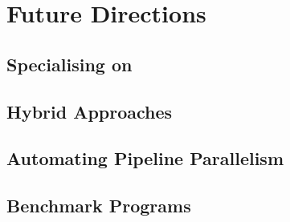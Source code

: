 \documentclass[openright, dottedtoc, headinclude, footinclude=true, a4paper, numbers=noenddot]{scrreprt}
\begin{document}
    \chapter{Future Directions}
    \label{chap:future}
    
    
        \section{Specialising on \underline{\hspace{2cm}}}
        \label{sec:specialiseDepth}
        
    
        \section{Hybrid Approaches}
        \label{sec:hybrid}
        
    
        \section{Automating Pipeline Parallelism}
        \label{sec:autoPipe}
        
    
    

\begin{appendices}

\chapter{Benchmark Programs}

\end{appendices}

\listoftodos[Notes]

\if@openright
  \cleardoublepage
\else
  \clearpage
\fi



\end{document}
